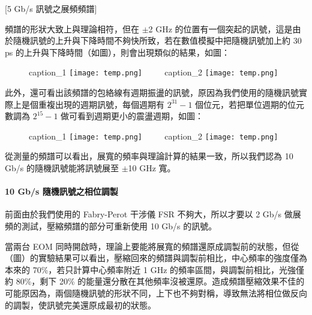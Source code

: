 \documentclass[class=NCU_thesis, crop=false]{standalone}
\begin{document}
[5 Gb/s 訊號之展頻頻譜]

頻譜的形狀大致上與理論相符，但在 $\pm$2 GHz 的位置有一個突起的訊號，這是由於隨機訊號的上升與下降時間不夠快所致，若在數值模擬中把隨機訊號加上約 30 ps 的上升與下降時間（如圖），則會出現類似的結果，如圖：

\begin{figure}[!hbt]
    \centering
    \subcaptionbox
        {caption\_1
        \label{fig:subfig_fig1}}
        {\texttt{[image: temp.png]}}
    ~~~~
    \subcaptionbox
        {caption\_2
        \label{fig:subfig_fig2}}
        {\texttt{[image: temp.png]}}
\end{figure}


此外，還可看出該頻譜的包絡線有週期振盪的訊號，原因為我們使用的隨機訊號實際上是個重複出現的週期訊號，每個週期有 $2^{31}-1$ 個位元，若把單位週期的位元數調為 $2^{15}-1$ 做可看到週期更小的震盪週期，如圖：

\begin{figure}[!hbt]
    \centering
    \subcaptionbox
        {caption\_1
        \label{fig:subfig_fig1}}
        {\texttt{[image: temp.png]}}
    ~~~~
    \subcaptionbox
        {caption\_2
        \label{fig:subfig_fig2}}
        {\texttt{[image: temp.png]}}
\end{figure}

從測量的頻譜可以看出，展寬的頻率與理論計算的結果一致，所以我們認為 10 Gb/s 的隨機訊號能將訊號展至 $\pm$10 GHz 寬。

\paragraph{10 Gb/s 隨機訊號之相位調製}

前面由於我們使用的 Fabry-Perot 干涉儀 FSR 不夠大，所以才要以 2 Gb/s 做展頻的測試，壓縮頻譜的部分可重新使用 10 Gb/s 的訊號。

當兩台 EOM 同時開啟時，理論上要能將展寬的頻譜還原成調製前的狀態，但從（圖）的實驗結果可以看出，壓縮回來的頻譜與調製前相比，中心頻率的強度僅為本來的 70\%，若只計算中心頻率附近 1 GHz 的頻率區間，與調製前相比，光強僅約 80\%，剩下 20\% 的能量還分散在其他頻率沒被還原。造成頻譜壓縮效果不佳的可能原因為，兩個隨機訊號的形狀不同，上下也不夠對稱，導致無法將相位做反向的調製，使訊號完美還原成最初的狀態。
\end{document}
